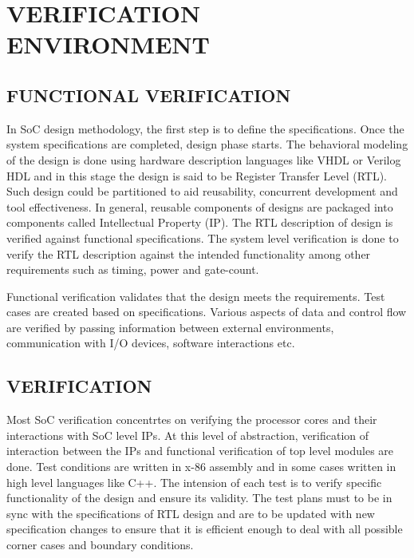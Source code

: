 \chapter{VERIFICATION ENVIRONMENT}
\label{chap:verification.tex}

\section {FUNCTIONAL VERIFICATION}

In SoC design methodology, the first step is to define the specifications. Once the system specifications are completed, design phase starts. The behavioral modeling of the design is done using hardware description languages like VHDL or Verilog HDL and in this stage the design is said to be Register Transfer Level (RTL). Such design could be partitioned to aid reusability, concurrent development and tool effectiveness. In general, reusable components of designs are packaged into components called Intellectual Property (IP). The RTL description of design is verified against functional specifications.  The system level verification is done to verify the RTL description against the intended functionality among other requirements such as timing, power and gate-count. 



Functional verification validates that the design meets the requirements. Test cases are created based on specifications. Various aspects of data and control flow are verified by passing information between external environments, communication with I/O devices,  software interactions etc. 
 
\section {VERIFICATION}

Most SoC verification concentrtes on verifying the processor cores and their interactions with SoC level IPs. At this level of abstraction, verification of interaction between the IPs and functional verification of top level modules are done.  Test conditions are written in x-86 assembly and in some cases written in high level languages like C++. The intension of each test is to verify specific functionality of the design and ensure its validity. The test plans must to be in sync with the specifications of RTL design and are to be updated with new specification changes to ensure that it is efficient enough to deal with all possible corner cases and boundary conditions.

